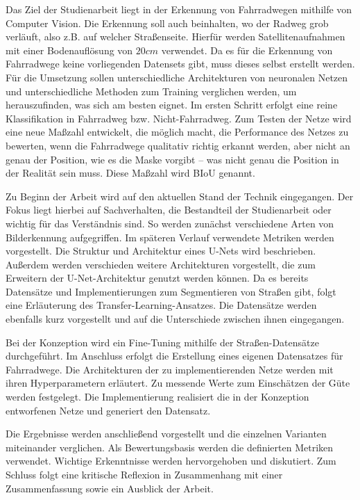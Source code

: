 Das Ziel der Studienarbeit liegt in der Erkennung von Fahrradwegen mithilfe von Computer Vision.
Die Erkennung soll auch beinhalten, wo der Radweg grob verläuft, also z.B. auf welcher Straßenseite.
Hierfür werden Satellitenaufnahmen mit einer Bodenauflösung von $20 cm$ verwendet.
Da es für die Erkennung von Fahrradwege keine vorliegenden Datensets gibt, muss dieses selbst erstellt werden.
Für die Umsetzung sollen unterschiedliche Architekturen von neuronalen Netzen und unterschiedliche Methoden 
zum Training verglichen werden, um herauszufinden, was sich am besten eignet. 
Im ersten Schritt erfolgt eine reine Klassifikation in Fahrradweg bzw. Nicht-Fahrradweg.
Zum Testen der Netze wird eine neue Maßzahl entwickelt, die möglich macht, 
die Performance des Netzes zu bewerten, wenn die Fahrradwege qualitativ richtig 
erkannt werden, aber nicht an genau der Position, wie es die Maske vorgibt -- 
was nicht genau die Position in der Realität sein muss.
Diese Maßzahl wird \ac{BIoU} genannt.


Zu Beginn der Arbeit wird auf den aktuellen Stand der Technik eingegangen.
Der Fokus liegt hierbei auf Sachverhalten, die Bestandteil der Studienarbeit oder wichtig für das Verständnis sind.
So werden zunächst verschiedene Arten von Bilderkennung aufgegriffen.
Im späteren Verlauf verwendete Metriken werden vorgestellt.
Die Struktur und Architektur eines U-Nets wird beschrieben. Außerdem werden verschieden weitere Architekturen 
vorgestellt, die zum Erweitern der U-Net-Architektur genutzt werden können.
Da es bereits Datensätze und Implementierungen zum Segmentieren von Straßen gibt, folgt eine Erläuterung des Transfer-Learning-Ansatzes.
Die Datensätze werden ebenfalls kurz vorgestellt und auf die Unterschiede zwischen ihnen eingegangen.

Bei der Konzeption wird ein Fine-Tuning mithilfe der Straßen-Datensätze durchgeführt.
Im Anschluss erfolgt die Erstellung eines eigenen Datensatzes für Fahrradwege.
Die Architekturen der zu implementierenden Netze werden mit ihren Hyperparametern erläutert.
Zu messende Werte zum Einschätzen der Güte werden festgelegt.
Die Implementierung realisiert die in der Konzeption entworfenen Netze und generiert den Datensatz.

Die Ergebnisse werden anschließend vorgestellt und die einzelnen Varianten miteinander verglichen.
Als Bewertungsbasis werden die definierten Metriken verwendet.
Wichtige Erkenntnisse werden hervorgehoben und diskutiert. 
Zum Schluss folgt eine kritische Reflexion in Zusammenhang mit einer Zusammenfassung sowie ein Ausblick der Arbeit.